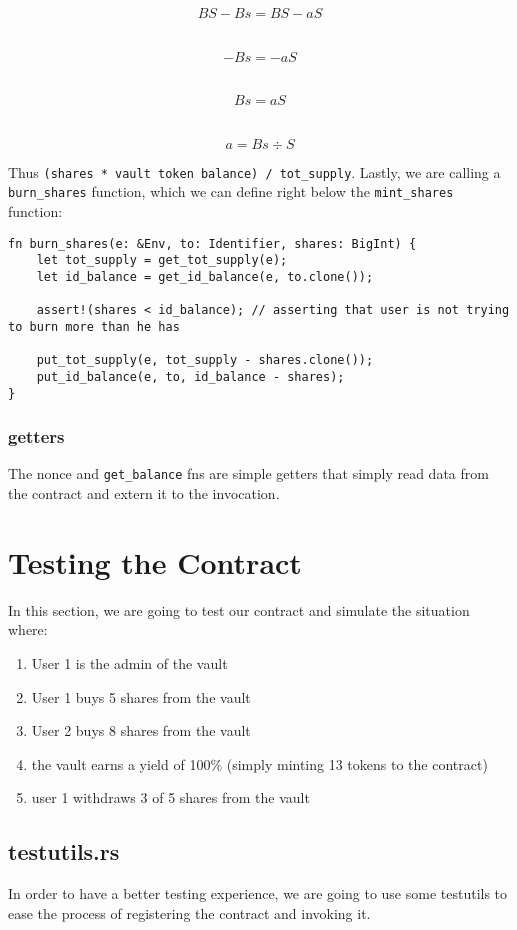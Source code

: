 \documentclass{article}
\newcommand{\inl}[1]{\lstinline{#1}}
\begin{document}
\[ BS - Bs = BS - aS \]
\

\[ - Bs = - aS \]
\

\[ Bs = aS \]
\

\[ a = Bs \div S \]

Thus \inl{(shares * vault token balance) / tot_supply}. Lastly, we are calling a \inl{burn_shares} function, which we can define right below the \inl{mint_shares} function:

\begin{lstlisting}
fn burn_shares(e: &Env, to: Identifier, shares: BigInt) {
    let tot_supply = get_tot_supply(e);
    let id_balance = get_id_balance(e, to.clone());

    assert!(shares < id_balance); // asserting that user is not trying to burn more than he has

    put_tot_supply(e, tot_supply - shares.clone());
    put_id_balance(e, to, id_balance - shares);
}

\end{lstlisting}

\subsubsection{getters}
The nonce and \inl{get_balance} fns are simple getters that simply read data from the contract and extern it to the invocation.

\section{Testing the Contract}
In this section, we are going to test our contract and simulate the situation where:
\begin{enumerate}
\item User 1 is the admin of the vault
\item User 1 buys 5 shares from the vault
\item User 2 buys 8 shares from the vault
\item the vault earns a yield of 100\% (simply minting 13 tokens to the contract)
\item user 1 withdraws 3 of 5 shares from the vault
\end{enumerate}

\subsection{testutils.rs}
In order to have a better testing experience, we are going to use some testutils to ease the process of registering the contract and invoking it.
\end{document}
